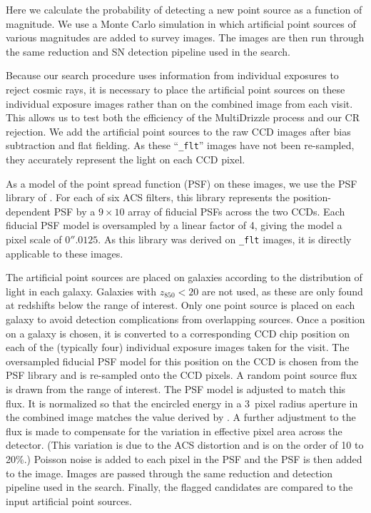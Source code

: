 
Here we calculate the probability of detecting a new point source as a
function of magnitude.  We use a Monte Carlo simulation in which
artificial point sources of various magnitudes are added to survey
images. The images are then run through the same reduction and SN
detection pipeline used in the search.

Because our search procedure uses information from individual
exposures to reject cosmic rays, it is necessary to place the
artificial point sources on these individual exposure images rather
than on the combined image from each visit. This allows us to test
both the efficiency of the {\sc MultiDrizzle} process and our CR
rejection. We add the artificial point sources to the raw CCD images
after bias subtraction and flat fielding. As these ``\texttt{\_flt}''
images have not been re-sampled, they accurately represent the light
on each CCD pixel.

As a model of the point spread function (PSF) on these images, we use
the PSF library of \citet{anderson06a}. For each of six ACS filters,
this library represents the position-dependent PSF by a $9 \times 10$
array of fiducial PSFs across the two CCDs. Each fiducial PSF model is
oversampled by a linear factor of 4, giving the model a pixel scale of
$0''.0125$. As this library was derived on \texttt{\_flt} images, it
is directly applicable to these images.

The artificial point sources are placed on galaxies according to the
distribution of light in each galaxy. Galaxies with $z_{850} < 20$ are
not used, as these are only found at redshifts below the range of
interest. Only one point source is placed on each galaxy to avoid
detection complications from overlapping sources.  Once a position on
a galaxy is chosen, it is converted to a corresponding CCD chip
position on each of the (typically four) individual exposure images
taken for the visit.  The oversampled fiducial PSF model for this
position on the CCD is chosen from the PSF library and is re-sampled
onto the CCD pixels. A random point source flux is drawn from the
range of interest. The PSF model is adjusted to match this flux. It is
normalized so that the encircled energy in a 3~pixel radius aperture
in the combined image matches the value derived
by \citet{sirianni05a}.  A further adjustment to the flux is made to
compensate for the variation in effective pixel area across the
detector. (This variation is due to the ACS distortion and is on the
order of 10 to 20\%.) Poisson noise is added to each pixel in the PSF
and the PSF is then added to the image.  Images are passed through the
same reduction and detection pipeline used in the search. Finally, the
flagged candidates are compared to the input artificial point sources.

